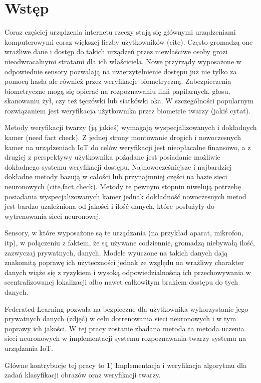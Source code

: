 \newpage
\section[Wstęp]{Wstęp}

Coraz częściej urządzenia internetu rzeczy stają się głównymi urządzeniami komputerowymi coraz
większej liczby użytkowników (cite). Często gromadzą one wrażliwe dane i dostęp do takich
urządzeń przez niewłaściwe osoby grozi nieodwracalnymi stratami dla ich właściciela. Nowe
przyrządy wyposażone w odpowiednie sensory pozwalają na uwierzytelnienie dostępu już nie tylko za
pomocą hasła ale również przez weryfikacje biometryczną. Zabezpieczenia biometryczne mogą się
opierać na rozpoznawaniu linii papilarnych, głosu, skanowaniu żył, czy też tęczówki lub siatkówki
oka. W szczególności popularnym rozwiązaniem jest weryfikacja użytkownika przez biometrie twarzy
(jakiś cytat).

Metody weryfikacji twarzy (ją jakieś) wymagają wyspecjalizowanych i dokładnych kamer (need fact
check). Z jednej strony montowanie drogich i nowoczesnych kamer na urządzeniach IoT do celów
weryfikacji jest nieopłacalne finansowo, a z drugiej z perspektywy użytkownika pożądane jest
posiadanie możliwie dokładnego systemu weryfikacji dostępu. Najnowocześniejsze i najbardziej
dokładne metody bazują w całości lub przynajmniej części na bazie sieci neuronowych (cite,fact
check). Metody te pewnym stopniu niwelują potrzebę posiadania wyspecjalizowanych kamer jednak
dokładność nowoczesnych metod jest bardzo uzależniona od jakości i ilość danych, które posłużyły
do wytrenowania sieci neuronowej.

Sensory, w które wyposażone są te urządzania (na przykład aparat, mikrofon, itp), w połączeniu z
faktem, że są używane codziennie, gromadzą niebywałą ilość, zazwyczaj prywatnych,
danych. Modele wyuczone na takich danych dają znakomitą poprawę ich użyteczności jednak ze względu
na wrażliwy charakter danych wiąże się z ryzykiem i wysoką odpowiedzialnością ich
przechowywania w scentralizowanej lokalizacji albo nawet całkowitym brakiem dostępu do tych
danych.

Federated Learning pozwala na bezpieczne dla użytkownika wykorzystanie jego prywatnych danych
(zdjęć) w celu dotrenowania sieci neuronowych i w tym poprawy ich jakości. W tej pracy zostanie
zbadana metoda ta metoda uczenia sieci neuronowych w implementacji systemu rozpoznawania twarzy
systemu na urządzania IoT.

Główne kontrybucje tej pracy to 1) Implementacja i weryfikacja algorytmu \fedavglong dla zadań klasyfikacji obrazów oraz weryfikacji twarzy.
